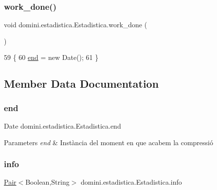 \subsubsection{\texorpdfstring{work\+\_\+done()}{work\_done()}}
{\footnotesize\ttfamily void domini.\+estadistica.\+Estadistica.\+work\+\_\+done (\begin{DoxyParamCaption}{ }\end{DoxyParamCaption})\hspace{0.3cm}{\ttfamily [inline]}}


\begin{DoxyCode}
59                             \{
60         \hyperlink{classdomini_1_1estadistica_1_1Estadistica_ae99e664f0569e308009ec7ca32864006}{end} = \textcolor{keyword}{new} Date();
61     \} 
\end{DoxyCode}


\subsection{Member Data Documentation}
\mbox{\label{classdomini_1_1estadistica_1_1Estadistica_ae99e664f0569e308009ec7ca32864006}} 
\subsubsection{\texorpdfstring{end}{end}}
{\footnotesize\ttfamily Date domini.\+estadistica.\+Estadistica.\+end\hspace{0.3cm}{\ttfamily [private]}}


\begin{DoxyParams}{Parameters}
{\em end} & Instància del moment en que acabem la compressió \\
\hline
\end{DoxyParams}
\mbox{\label{classdomini_1_1estadistica_1_1Estadistica_a57776a71683b3717b638377073b8a99e}} 
\subsubsection{\texorpdfstring{info}{info}}
{\footnotesize\ttfamily \hyperlink{classdomini_1_1utils_1_1Pair}{Pair}$<$Boolean,String$>$ domini.\+estadistica.\+Estadistica.\+info\hspace{0.3cm}{\ttfamily [private]}}



